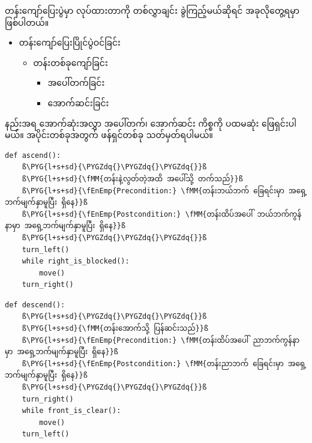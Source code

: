 တန်းကျော်ပြေးပွဲမှာ  လုပ်ထားတာကို တစ်လွှာချင်း ခွဲကြည့်မယ်ဆိုရင် အခုလိုတွေ့ရမှာ ဖြစ်ပါတယ်။
%
\begin{itemize}
  \item တန်းကျော်ပြေးပြိုင်ပွဲဝင်ခြင်း
  \begin{itemize}
    \item တန်းတစ်ခုကျော်ခြင်း
    \begin{itemize}
      \item အပေါ်တက်ခြင်း
      \item အောက်ဆင်းခြင်း
    \end{itemize}
  \end{itemize} 
\end{itemize}
%
 နည်းအရ အောက်ဆုံးအလွှာ အပေါ်တက်၊ အောက်ဆင်း ကိစ္စကို ပထမဆုံး ဖြေရှင်းပါမယ်။ အပိုင်းတစ်ခုအတွက် ဖန်ရှင်တစ်ခု သတ်မှတ်ရပါမယ်။

%
\setlength{\fboxsep}{0pt}
\begin{verbatim}
def ascend():
    ß\PYG{l+s+sd}{\PYGZdq{}\PYGZdq{}\PYGZdq{}}ß
    ß\PYG{l+s+sd}{\fMM{တန်းနဲ့လွတ်တဲ့အထိ အပေါ်သို့ တက်သည်}}ß
    ß\PYG{l+s+sd}{\fEnEmp{Precondition:} \fMM{တန်းဘယ်ဘက် ခြေရင်းမှာ အရှေ့ဘက်မျက်နှာမူပြီး ရှိနေ}}ß
    ß\PYG{l+s+sd}{\fEnEmp{Postcondition:} \fMM{တန်းထိပ်အပေါ် ဘယ်ဘက်ကွန်နာမှာ အရှေ့ဘက်မျက်နှာမူပြီး ရှိနေ}}ß
    ß\PYG{l+s+sd}{\PYGZdq{}\PYGZdq{}\PYGZdq{}}ß
    turn_left()
    while right_is_blocked():
        move()
    turn_right()
\end{verbatim}
%
\betweenminted{\medskipamount}
%
\setlength{\fboxsep}{0pt}
\begin{verbatim}
def descend():
    ß\PYG{l+s+sd}{\PYGZdq{}\PYGZdq{}\PYGZdq{}}ß
    ß\PYG{l+s+sd}{\fMM{တန်းအောက်သို့ ပြန်ဆင်းသည်}}ß
    ß\PYG{l+s+sd}{\fEnEmp{Precondition:} \fMM{တန်းထိပ်အပေါ် ညာဘက်ကွန်နာမှာ အရှေ့ဘက်မျက်နှာမူပြီး ရှိနေ}}ß
    ß\PYG{l+s+sd}{\fEnEmp{Postcondition:} \fMM{တန်းညာဘက် ခြေရင်းမှာ အရှေ့ဘက်မျက်နှာမူပြီး ရှိနေ}}ß
    ß\PYG{l+s+sd}{\PYGZdq{}\PYGZdq{}\PYGZdq{}}ß
    turn_right()
    while front_is_clear():
        move()
    turn_left()
\end{verbatim}
%

